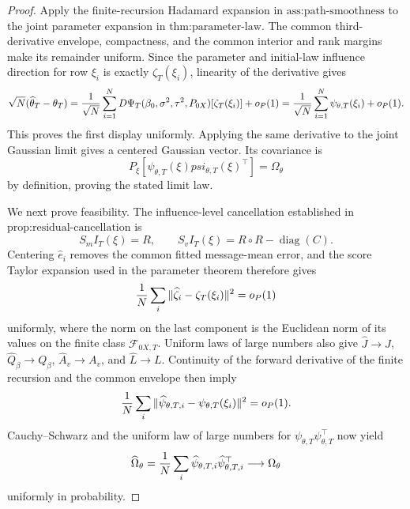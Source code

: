 \documentclass{article}
\begin{document}
\begin{proof}
Apply the finite-recursion Hadamard expansion in \(\text{ass:path-smoothness}\) to the joint parameter expansion in \(\text{thm:parameter-law}\).  The common third-derivative envelope, compactness, and the common interior and rank margins make its remainder uniform.  Since the parameter and initial-law influence direction for row \(\xi_i\) is exactly \(\zeta_T(\xi_i)\), linearity of the derivative gives
\[
 \sqrt N(\widehat\theta_T-\theta_T)
 ={1\over\sqrt N}\sum_{i=1}^ND\Psi_T(\beta_0,\sigma^2,\tau^2,P_{0X})[\zeta_T(\xi_i)]+o_P(1)
 ={1\over\sqrt N}\sum_{i=1}^N\psi_{\theta,T}(\xi_i)+o_P(1).
\]
This proves the first display uniformly.  Applying the same derivative to the joint Gaussian limit gives a centered Gaussian vector.  Its covariance is
\[
 P_\xi[\psi_{\theta,T}(\xi)psi_{\theta,T}(\xi)^{\top}]=\Omega_\theta
\]
by definition, proving the stated limit law.

We next prove feasibility.  The influence-level cancellation established in \(\text{prop:residual-cancellation}\) is
\[
 S_mI_T(\xi)=R,
 \qquad S_vI_T(\xi)=R\circ R-\operatorname{diag}(C).
\]
Centering \(\widehat e_i\) removes the common fitted message-mean error, and the score Taylor expansion used in the parameter theorem therefore gives
\[
 {1\over N}\sum_i\|\widehat\zeta_i-\zeta_T(\xi_i)\|^2=o_P(1)
\]
uniformly, where the norm on the last component is the Euclidean norm of its values on the finite class \(\mathcal F_{0X,T}\).  Uniform laws of large numbers also give \(\widehat J\to J\), \(\widehat Q_\beta\to Q_\beta\), \(\widehat A_v\to A_v\), and \(\widehat L\to L\).  Continuity of the forward derivative of the finite recursion and the common envelope then imply
\[
 {1\over N}\sum_i\|\widehat\psi_{\theta,T,i}-\psi_{\theta,T}(\xi_i)\|^2=o_P(1).
\]
Cauchy--Schwarz and the uniform law of large numbers for \(\psi_{\theta,T}\psi_{\theta,T}^{\top}\) now yield
\[
 \widehat\Omega_\theta={1\over N}\sum_i\widehat\psi_{\theta,T,i}\widehat\psi_{\theta,T,i}^{\top}
 \longrightarrow\Omega_\theta
\]
uniformly in probability.


\end{proof}
\end{document}

